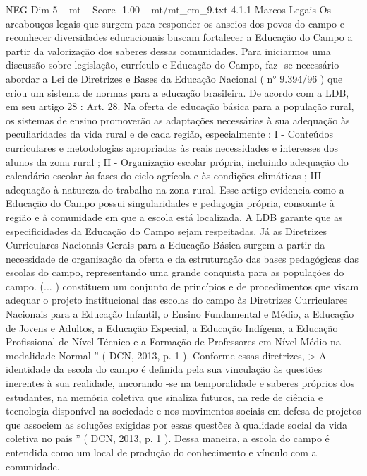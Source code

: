 \begin{textsample}{NEG Dim 5 – mt – Score -1.00 – mt/mt\_em\_9.txt}  \label{ex:f5_neg_208}
4.1.1 Marcos Legais Os arcabouços legais que surgem para responder os anseios dos povos do campo e reconhecer diversidades educacionais buscam fortalecer a Educação do Campo a partir da valorização dos saberes dessas comunidades.
Para iniciarmos uma discussão sobre legislação, currículo e Educação do Campo, faz -se necessário abordar a Lei de Diretrizes e Bases da Educação Nacional ( n{\EmojiFont °} 9.394/96 ) que criou um sistema de normas para a educação brasileira.
De acordo com a LDB, em seu artigo 28 : Art. 28.
Na oferta de educação básica para a população rural, os sistemas de ensino promoverão as adaptações necessárias à sua adequação às peculiaridades da vida rural e de cada região, especialmente : I - Conteúdos curriculares e metodologias apropriadas às reais necessidades e interesses dos alunos da zona rural ; II - Organização escolar própria, incluindo adequação do calendário escolar às fases do ciclo agrícola e às condições climáticas ; III - adequação à natureza do trabalho na zona rural.
Esse artigo evidencia como a Educação do Campo possui singularidades e pedagogia própria, consoante à região e à comunidade em que a escola está localizada.
A LDB garante que as especificidades da Educação do Campo sejam respeitadas.
Já as Diretrizes Curriculares Nacionais Gerais para a Educação Básica surgem a partir da necessidade de organização da oferta e da estruturação das bases pedagógicas das escolas do campo, representando uma grande conquista para as populações do campo. (... ) constituem um conjunto de princípios e de procedimentos que visam adequar o projeto institucional das escolas do campo às Diretrizes Curriculares Nacionais para a Educação Infantil, o Ensino Fundamental e Médio, a Educação de Jovens e Adultos, a Educação Especial, a Educação Indígena, a Educação Profissional de Nível Técnico e a Formação de Professores em Nível Médio na modalidade Normal ” ( DCN, 2013, p. 1 ).
Conforme essas diretrizes, > A identidade da escola do campo é definida pela sua vinculação às questões inerentes à sua realidade, ancorando -se na temporalidade e saberes próprios dos estudantes, na memória coletiva que sinaliza futuros, na rede de ciência e tecnologia disponível na sociedade e nos movimentos sociais em defesa de projetos que associem as soluções exigidas por essas questões à qualidade social da vida coletiva no país ” ( DCN, 2013, p. 1 ).
Dessa maneira, a escola do campo é entendida como um local de produção do conhecimento e vínculo com a comunidade.

\end{textsample}
